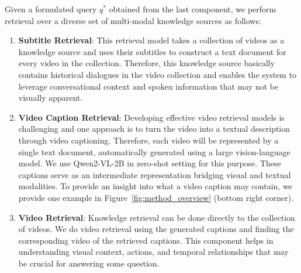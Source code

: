 Given a formulated query $q^*$ obtained from the last component, we perform retrieval over a diverse set of multi-modal knowledge sources as follows:
\begin{enumerate}[leftmargin=*]
\item \textbf{Subtitle Retrieval}: This retrieval model takes a collection of videos as a knowledge source and uses their subtitles to construct a text document for every video in the collection. Therefore, this knowledge source basically contains historical dialogues in the video collection and enables the system to leverage conversational context and spoken information that may not be visually apparent.



\item \textbf{Video Caption Retrieval}: Developing effective video retrieval models is challenging and one approach is to turn the video into a textual description through video captioning. Therefore, each video will be represented by a single text document, automatically generated using a large vision-language model. We use Qwen2-VL-2B \cite{wang2024qwen2vl} in zero-shot setting for this purpose. These captions serve as an intermediate representation bridging visual and textual modalities. To provide an insight into what a video caption may contain, we provide one example in Figure~\ref{fig:method_overview} (bottom right corner).


\item \textbf{Video Retrieval}: Knowledge retrieval can be done directly to the collection of videos. We do video retrieval using the generated captions and finding the corresponding video of the retrieved captions. This component helps in understanding visual context, actions, and temporal relationships that may be crucial for answering some question.



\end{enumerate}

